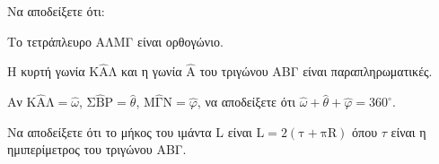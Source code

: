 \begin{alist}
    \item Να αποδείξετε ότι:
    \begin{rlist}
        \item Το τετράπλευρο ΑΛΜΓ είναι ορθογώνιο. 
        \item Η κυρτή γωνία $\mathrm{K\hat{A}\Lambda}$ και η γωνία $\hat{\mathrm{A}}$ του τριγώνου ΑΒΓ είναι παραπληρωματικές. 
    \end{rlist}
    \item Αν $\mathrm{K\hat{A}\Lambda} = \hat{\omega}$, $\mathrm{\Sigma\hat{B}P} = \hat{\theta}$, $\mathrm{M\hat{\Gamma}N} = \hat{\varphi}$, να αποδείξετε ότι $\hat{\omega} + \hat{\theta} + \hat{\varphi} = 360^\circ$. 
    \item Να αποδείξετε ότι το μήκος του ιμάντα L είναι $\mathrm{L = 2(\tau + \pi R)}$ όπου $\tau$ είναι η ημιπερίμετρος του τριγώνου ΑΒΓ. 
\end{alist}